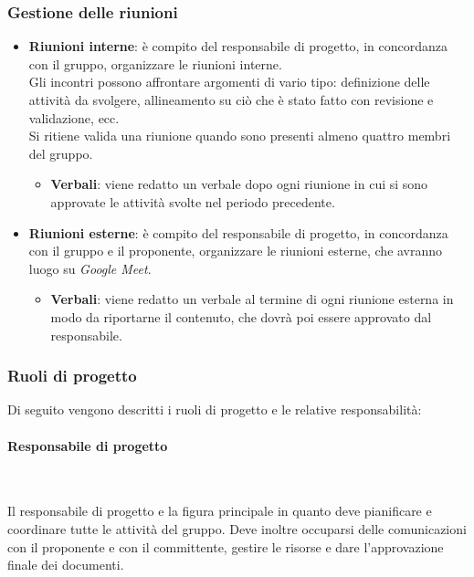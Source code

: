         \subsubsection{Gestione delle riunioni}
            \begin{itemize}
                \item \textbf{Riunioni interne}: è compito del responsabile di progetto, in concordanza con il gruppo, organizzare le riunioni interne. \\
                Gli incontri possono affrontare argomenti di vario tipo: definizione delle attività da svolgere, allineamento su ciò che è stato fatto con revisione e validazione, ecc. \\
                Si ritiene valida una riunione quando sono presenti almeno quattro membri del gruppo.
                    \begin{itemize}
                        \item \textbf{Verbali}: viene redatto un verbale dopo ogni riunione in cui si sono approvate le attività svolte nel periodo precedente.
                    \end{itemize}
                \item \textbf{Riunioni esterne}: è compito del responsabile di progetto, in concordanza con il gruppo e il proponente, organizzare le riunioni esterne, che avranno luogo su \textit{Google Meet}.
                \begin{itemize}
                    \item \textbf{Verbali}: viene redatto un verbale al termine di ogni riunione esterna in modo da riportarne il contenuto, che dovrà poi essere approvato dal responsabile.
                \end{itemize}
            \end{itemize}
        \subsubsection{Ruoli di progetto}
        Di seguito vengono descritti i ruoli di progetto e le relative responsabilità:

        \paragraph{Responsabile di progetto} ~

        Il responsabile di progetto e la figura principale in quanto deve pianificare e coordinare tutte le attività del gruppo. Deve inoltre occuparsi delle comunicazioni con il proponente e con il committente, gestire le risorse e dare l'approvazione finale dei documenti.

